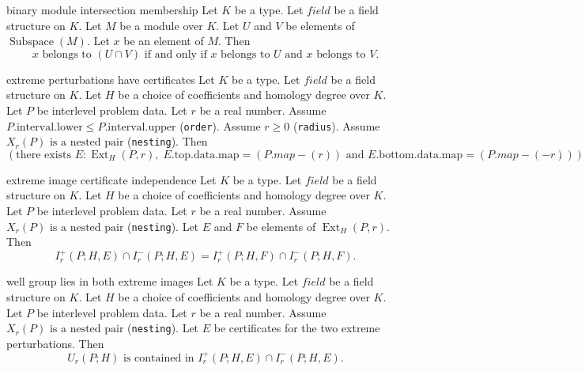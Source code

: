 \begin{cleanresult}{binary module intersection membership}
Let $K$ be a type.
Let $\mathit{field}$ be a field structure on $K$.
Let $M$ be a module over $K$.
Let $U$ and $V$ be elements of $\operatorname{Subspace}(M)$.
Let $x$ be an element of $M$.
Then \[x\text{ belongs to }\left(U\cap V\right)\text{ if and only if }x\text{ belongs to }U\text{ and }x\text{ belongs to }V.\]
\end{cleanresult}

\begin{cleanresult}{extreme perturbations have certificates}
Let $K$ be a type.
Let $\mathit{field}$ be a field structure on $K$.
Let $H$ be a choice of coefficients and homology degree over $K$.
Let $P$ be interlevel problem data.
Let $r$ be a real number.
Assume $P.\mathrm{interval}.\mathrm{lower}\le P.\mathrm{interval}.\mathrm{upper}$ (\texttt{order}).
Assume $r\ge 0$ (\texttt{radius}).
Assume $X_{r}(P)\text{ is a nested pair}$ (\texttt{nesting}).
Then \[\left(\text{there exists }E : \operatorname{Ext}_{H}(P,r),\; E.\mathrm{top}.\mathrm{data}.\mathrm{map}=\left(P.map-\left(r\right)\right)\text{ and }E.\mathrm{bottom}.\mathrm{data}.\mathrm{map}=\left(P.map-\left(-r\right)\right)\right).\]
\par{}
\end{cleanresult}

\begin{cleanresult}{extreme image certificate independence}
Let $K$ be a type.
Let $\mathit{field}$ be a field structure on $K$.
Let $H$ be a choice of coefficients and homology degree over $K$.
Let $P$ be interlevel problem data.
Let $r$ be a real number.
Assume $X_{r}(P)\text{ is a nested pair}$ (\texttt{nesting}).
Let $E$ and $F$ be elements of $\operatorname{Ext}_{H}(P,r)$.
Then \[I^+_{r}(P;H,E)\cap I^-_{r}(P;H,E)=I^+_{r}(P;H,F)\cap I^-_{r}(P;H,F).\]
\end{cleanresult}

\begin{cleanresult}{well group lies in both extreme images}
Let $K$ be a type.
Let $\mathit{field}$ be a field structure on $K$.
Let $H$ be a choice of coefficients and homology degree over $K$.
Let $P$ be interlevel problem data.
Let $r$ be a real number.
Assume $X_{r}(P)\text{ is a nested pair}$ (\texttt{nesting}).
Let $E$ be certificates for the two extreme perturbations.
Then \[U_{r}(P;H)\text{ is contained in }I^+_{r}(P;H,E)\cap I^-_{r}(P;H,E).\]
\par{}
\end{cleanresult}

